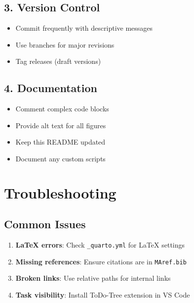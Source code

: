 \documentclass[
  11pt,
  letterpaper,
]{book}
\providecommand{\tightlist}{%
  \setlength{\itemsep}{0pt}\setlength{\parskip}{0pt}}
\begin{document}
\subsection*{3. Version Control}\label{version-control}

\begin{itemize}
\tightlist
\item
  Commit frequently with descriptive messages
\item
  Use branches for major revisions
\item
  Tag releases (draft versions)
\end{itemize}

\subsection*{4. Documentation}\label{documentation}

\begin{itemize}
\tightlist
\item
  Comment complex code blocks
\item
  Provide alt text for all figures
\item
  Keep this README updated
\item
  Document any custom scripts
\end{itemize}

\section*{Troubleshooting}\label{troubleshooting}


\subsection*{Common Issues}\label{common-issues}

\begin{enumerate}
\def\labelenumi{\arabic{enumi}.}
\tightlist
\item
  \textbf{LaTeX errors}: Check \texttt{\_quarto.yml} for LaTeX settings
\item
  \textbf{Missing references}: Ensure citations are in
  \texttt{MAref.bib}
\item
  \textbf{Broken links}: Use relative paths for internal links
\item
  \textbf{Task visibility}: Install ToDo-Tree extension in VS Code
\end{enumerate}
\end{document}
